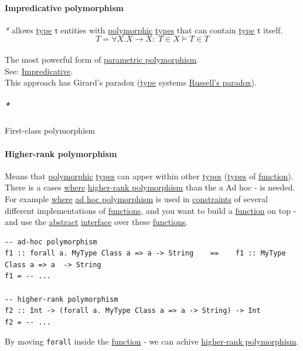 \documentclass[11pt]{article}
\begin{document}
\paragraph{\label{org517cf1b}Impredicative polymorphism}
\label{sec:org102f05d}
\emph{*} allows \hyperref[orgc4aea2f]{type} τ entities with \hyperref[orgac4d581]{polymorphic} \hyperref[org4209edd]{types} that can contain \hyperref[orgc4aea2f]{type} τ itself.\\
$$ T = \forall X. X \to X : \; T \in X \vDash T \in T $$\\

The most powerful form of \hyperref[org3c0b242]{parametric polymorphism}.\\
See: \hyperref[org989a83a]{Impredicative}.\\

This approach has Girard's paradox (\hyperref[orgc4aea2f]{type} systems \hyperref[orga240e2d]{Russell's paradox}).\\

\subparagraph{\emph{*}}
\label{sec:orgfa37bd6}

\label{org36726d8}First-class polymorphism\\

\paragraph{\label{org2a1b1f6}Higher-rank polymorphism}
\label{sec:org1374345}
Means that \hyperref[orgac4d581]{polymorphic} \hyperref[org4209edd]{types} can apper within other \hyperref[org4209edd]{types} (\hyperref[org4209edd]{types} of \hyperref[orge15bc14]{function}).\\
There is a cases \hyperref[org3e5903d]{where} \hyperref[org2a1b1f6]{higher-rank polymorphism} than the a Ad hoc - is needed. For example \hyperref[org3e5903d]{where} \hyperref[org5f41089]{ad hoc polymorphism} is used in \hyperref[orgcddf7a9]{constraints} of several different implementations of \hyperref[orgaa8fb87]{functions}, and you want to build a \hyperref[orge15bc14]{function} on top - and use the \hyperref[orgbbe9132]{abstract} \hyperref[orgf9bdf66]{interface} over these \hyperref[orgaa8fb87]{functions}.\\
\begin{verbatim}
-- ad-hoc polymorphism
f1 :: forall a. MyType Class a => a -> String    ==    f1 :: MyType Class a => a  -> String
f1 = -- ...

-- higher-rank polymorphism
f2 :: Int -> (forall a. MyType Class a => a -> String) -> Int
f2 = -- ...
\end{verbatim}
By moving \texttt{forall} inside the \hyperref[orge15bc14]{function} - we can achive \hyperref[org2a1b1f6]{higher-rank polymorphism}.\\
\end{document}
